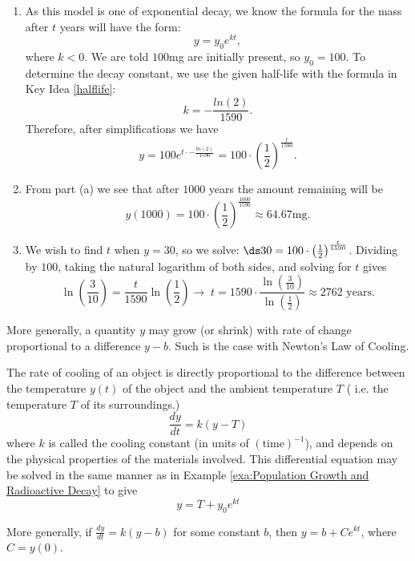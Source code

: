 \begin{solution}
\begin{enumerate}
\item As this model is one of exponential decay, we know the formula for the mass after $t$ years will have the form:
\[
y=y_0e^{kt},
\]
where $k<0$. We are told $100$mg are initially present, so $ y_0=100$. To determine the decay constant, we use the given half-life with the formula in Key Idea \ref{halflife}:
\[
k =  -\frac{ln(2)}{1590}.
\] 
Therefore, after simplifications we have
\[
y=100e^{t\cdot -\frac{ln(2)}{1590}} = 100\cdot \left(\frac12\right)^\frac{t}{1590}.
\]
\item From part (a) we see that after $ 1000 $  years the amount remaining will be
\[
y(1000)=100\cdot \left(\frac12\right)^{\frac{1000}{1590}}\approx 64.67\textrm{mg}.
\]
 
\item  We wish to find $t$ when $y=30$, so we solve: $\ds 30=100\cdot \left(\frac12\right)^{\frac{t}{1590}}$. Dividing by $ 100 $, taking the natural logarithm of both sides, and solving for $ t $ gives
\[
\ln\left(\frac{3}{10}\right)= \frac{t}{1590} \ln\left(\frac12\right)
\to\;t= 1590\cdot\frac{\ln\left(\frac{3}{10}\right)}{\ln\left(\frac12\right)}\approx 2762 \textrm{ years.}
\]

\end{enumerate}

\end{solution}

More generally, a quantity $y$ may grow (or shrink) with rate of change proportional to a difference $y-b$. Such is the case with Newton's Law of Cooling. 

\begin{formulabox}
The rate of cooling of an object is directly proportional to the difference between the temperature $y(t)$ of the object and the ambient temperature $T$ ( i.e. the temperature $T$ of its surroundings.)
  \[
  \frac{dy}{dt}=k(y-T)
  \]                  
where $ k $ is called the cooling constant (in units of $ (\text{time})^{-1} $), and depends on the physical properties of the materials involved. This differential equation may be solved in the same manner as in Example \ref{exa:Population Growth and Radioactive Decay} to give
\[
y= T+y_0e^{kt}
\]                   
\end{formulabox}


More generally, if $\frac{dy}{dt} = k(y-b) $ for some constant $ b $, then $ y=b+Ce^{kt} $, where $ C=y(0)$.


